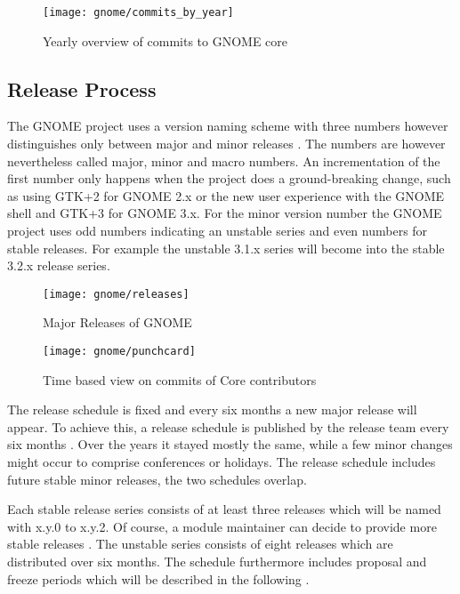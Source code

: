\begin{figure}[htbp]
  \centering
  \texttt{[image: gnome/commits\_by\_year]}
  \caption{Yearly overview of commits to GNOME core}
\end{figure}


\subsection{Release Process} %

The GNOME project uses a version naming scheme with three numbers however
distinguishes only between major and minor releases
\cite{GNOMEDevelopmentSchedule,GNOMESchedule}. The numbers are however
nevertheless called major, minor and macro numbers. An incrementation of the
first number only happens when the project does a ground-breaking change, such
as using GTK+2 for GNOME 2.x or the new user experience with the GNOME shell
and GTK+3 for GNOME 3.x. For the minor version number the GNOME project uses
odd numbers indicating an unstable series and even numbers for stable releases.
For example the unstable 3.1.x series will become into the stable 3.2.x release
series.

\begin{figure}[htbp]
  \centering
  \texttt{[image: gnome/releases]}
  \caption{Major Releases of GNOME}
\end{figure}

\begin{figure}[htbp]
  \centering
  \texttt{[image: gnome/punchcard]}
  \caption{Time based view on commits of Core contributors}
\end{figure}

The release schedule is fixed and every six months a new major release will
appear. To achieve this, a release schedule is published by the release team
every six months \cite{GNOMEDevelopmentSchedule}. Over the years it stayed
mostly the same, while a few minor changes might occur to comprise conferences
or holidays. The release schedule includes future stable minor releases, the
two schedules overlap.

Each stable release series consists of at least three releases which will be
named with x.y.0 to x.y.2. Of course, a module maintainer can decide to provide
more stable releases \cite{GNOMEReleaseTeam}. The unstable series consists of
eight releases which are distributed over six months. The schedule furthermore
includes proposal and freeze periods which will be described in the following
\cite{GNOMEDevelopmentSchedule,GNOMESchedule}.

